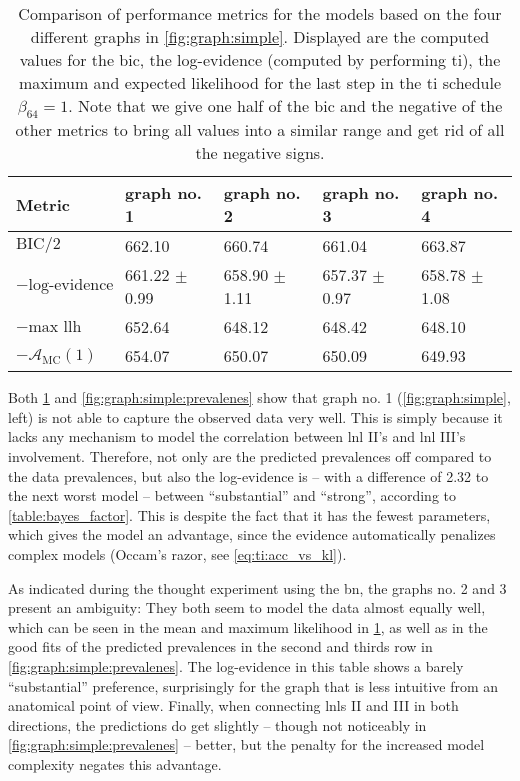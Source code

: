 \documentclass[\relativeRoot/main.tex]{subfiles}
\begin{document}
\begin{table}
    \centering
    \begin{tabular}{|l|l|l|l|l|}
        \hline
        \textbf{Metric} & \textbf{graph no. 1} & \textbf{graph no. 2} & \textbf{graph no. 3} & \textbf{graph no. 4} \\
        \hline
        $\text{BIC} / 2$ & 662.10 & 660.74 & 661.04 & 663.87 \\
        $- \text{log-evidence}$ & 661.22 $\pm$ 0.99 & 658.90 $\pm$ 1.11 & 657.37 $\pm$ 0.97 & 658.78 $\pm$ 1.08 \\
        $- \text{max llh}$ & 652.64 & 648.12 & 648.42 & 648.10 \\
        $- \mathcal{A}_\text{MC}(1)$ & 654.07 & 650.07 & 650.09 & 649.93 \\
        \hline
    \end{tabular}
    \caption[
        Comparison of performance metrics for four different simple graphs
    ]{
        Comparison of performance metrics for the models based on the four different graphs in \cref{fig:graph:simple}. Displayed are the computed values for the \acrlong{bic}, the log-evidence (computed by performing \acrlong{ti}), the maximum and expected likelihood for the last step in the \gls{ti} schedule $\beta_{64} = 1$. Note that we give one half of the \gls{bic} and the negative of the other metrics to bring all values into a similar range and get rid of all the negative signs.
    }
    \label{table:graph:simple:comp}
\end{table}

Both \cref{table:graph:simple:comp} and \cref{fig:graph:simple:prevalenes} show that graph no. 1 (\cref{fig:graph:simple}, left) is not able to capture the observed data very well. This is simply because it lacks any mechanism to model the correlation between \gls{lnl} II's and \gls{lnl} III's involvement. Therefore, not only are the predicted prevalences off compared to the data prevalences, but also the log-evidence is -- with a difference of 2.32 to the next worst model -- between ``substantial'' and ``strong'', according to \cref{table:bayes_factor}. This is despite the fact that it has the fewest parameters, which gives the model an advantage, since the evidence automatically penalizes complex models (Occam's razor, see \cref{eq:ti:acc_vs_kl}).

As indicated during the thought experiment using the \acrlong{bn}, the graphs no. 2 and 3 present an ambiguity: They both seem to model the data almost equally well, which can be seen in the mean and maximum likelihood in \cref{table:graph:simple:comp}, as well as in the good fits of the predicted prevalences in the second and thirds row in \cref{fig:graph:simple:prevalenes}. The log-evidence in this table shows a barely ``substantial'' preference, surprisingly for the graph that is less intuitive from an anatomical point of view. Finally, when connecting \glspl{lnl} II and III in both directions, the predictions do get slightly -- though not noticeably in \cref{fig:graph:simple:prevalenes} -- better, but the penalty for the increased model complexity negates this advantage.
\end{document}
